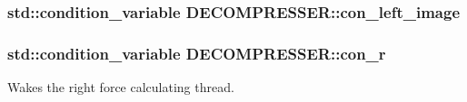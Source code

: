 \hypertarget{class_d_e_c_o_m_p_r_e_s_s_e_r_a2c0c696518b5fabce9e67bad1ba0575b}{
\subsubsection[{con\-\_\-left\-\_\-image}]{\setlength{\rightskip}{0pt plus 5cm}std\-::condition\-\_\-variable D\-E\-C\-O\-M\-P\-R\-E\-S\-S\-E\-R\-::con\-\_\-left\-\_\-image\hspace{0.3cm}{\ttfamily [private]}}}\label{class_d_e_c_o_m_p_r_e_s_s_e_r_a2c0c696518b5fabce9e67bad1ba0575b}
\hypertarget{class_d_e_c_o_m_p_r_e_s_s_e_r_a04c8c6987f5a9d3b1a8be8d79f1e4ead}{
\subsubsection[{con\-\_\-r}]{\setlength{\rightskip}{0pt plus 5cm}std\-::condition\-\_\-variable D\-E\-C\-O\-M\-P\-R\-E\-S\-S\-E\-R\-::con\-\_\-r\hspace{0.3cm}{\ttfamily [private]}}}\label{class_d_e_c_o_m_p_r_e_s_s_e_r_a04c8c6987f5a9d3b1a8be8d79f1e4ead}


Wakes the right force calculating thread. 

